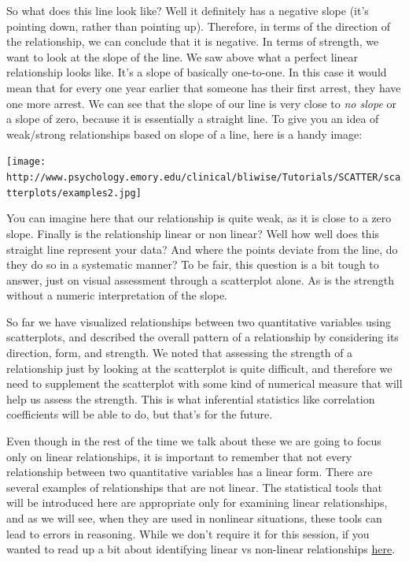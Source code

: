 \documentclass[]{book}
\theoremstyle{definition}
\theoremstyle{definition}
\theoremstyle{definition}
\theoremstyle{remark}
\begin{document}
So what does this line look like? Well it definitely has a negative
slope (it's pointing down, rather than pointing up). Therefore, in terms
of the direction of the relationship, we can conclude that it is
negative. In terms of strength, we want to look at the slope of the
line. We saw above what a perfect linear relationship looks like. It's a
slope of basically one-to-one. In this case it would mean that for every
one year earlier that someone has their first arrest, they have one more
arrest. We can see that the slope of our line is very close to \emph{no
slope} or a slope of zero, because it is essentially a straight line. To
give you an idea of weak/strong relationships based on slope of a line,
here is a handy image:

\texttt{[image: http://www.psychology.emory.edu/clinical/bliwise/Tutorials/SCATTER/scatterplots/examples2.jpg]}

You can imagine here that our relationship is quite weak, as it is close
to a zero slope. Finally is the relationship linear or non linear? Well
how well does this straight line represent your data? And where the
points deviate from the line, do they do so in a systematic manner? To
be fair, this question is a bit tough to answer, just on visual
assessment through a scatterplot alone. As is the strength without a
numeric interpretation of the slope.

So far we have visualized relationships between two quantitative
variables using scatterplots, and described the overall pattern of a
relationship by considering its direction, form, and strength. We noted
that assessing the strength of a relationship just by looking at the
scatterplot is quite difficult, and therefore we need to supplement the
scatterplot with some kind of numerical measure that will help us assess
the strength. This is what inferential statistics like correlation
coefficients will be able to do, but that's for the future.

Even though in the rest of the time we talk about these we are going to
focus only on linear relationships, it is important to remember that not
every relationship between two quantitative variables has a linear form.
There are several examples of relationships that are not linear. The
statistical tools that will be introduced here are appropriate only for
examining linear relationships, and as we will see, when they are used
in nonlinear situations, these tools can lead to errors in reasoning.
While we don't require it for this session, if you wanted to read up a
bit about identifying linear vs non-linear relationships
\href{http://blog.minitab.com/blog/adventures-in-statistics-2/linear-or-nonlinear-regression-that-is-the-question}{here}.
\end{document}
